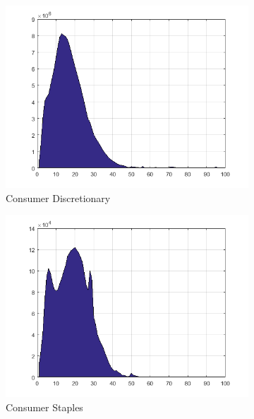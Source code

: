 \documentclass[11pt,a4,twosided,singlespacing,titlepagenumber=on]{scrreprt}
\numberwithin{equation}{chapter} %
\theoremstyle{remark}
\begin{document}
\begin{figure}[H]
\centering
    \begin{subfigure}[t]{0.23\textwidth}
        \centering
        \includegraphics[width=1\textwidth]{quad/1}
        \caption{Consumer Discretionary}
    \end{subfigure}
    \begin{subfigure}[t]{0.23\textwidth}
        \centering
        \includegraphics[width=1\textwidth]{quad/2}
        \caption{Consumer Staples}
    \end{subfigure}
    \begin{subfigure}[t]{0.23\textwidth}
        \centering

\end{subfigure}
\end{figure}
\end{document}
